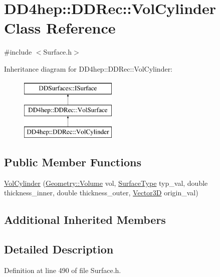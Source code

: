 \hypertarget{class_d_d4hep_1_1_d_d_rec_1_1_vol_cylinder}{}\section{D\+D4hep\+:\+:D\+D\+Rec\+:\+:Vol\+Cylinder Class Reference}
\label{class_d_d4hep_1_1_d_d_rec_1_1_vol_cylinder}


{\ttfamily \#include $<$Surface.\+h$>$}

Inheritance diagram for D\+D4hep\+:\+:D\+D\+Rec\+:\+:Vol\+Cylinder\+:\begin{figure}[H]
\begin{center}
\leavevmode
\includegraphics[height=3.000000cm]{class_d_d4hep_1_1_d_d_rec_1_1_vol_cylinder}
\end{center}
\end{figure}
\subsection*{Public Member Functions}
\begin{DoxyCompactItemize}
\item 
\hyperlink{class_d_d4hep_1_1_d_d_rec_1_1_vol_cylinder_ae559c0cb9b5a969ba0f14db3d419d376}{Vol\+Cylinder} (\hyperlink{class_d_d4hep_1_1_geometry_1_1_volume}{Geometry\+::\+Volume} vol, \hyperlink{class_d_d_surfaces_1_1_surface_type}{Surface\+Type} typ\+\_\+val, double thickness\+\_\+inner, double thickness\+\_\+outer, \hyperlink{class_d_d_surfaces_1_1_vector3_d}{Vector3D} origin\+\_\+val)
\end{DoxyCompactItemize}
\subsection*{Additional Inherited Members}


\subsection{Detailed Description}


Definition at line 490 of file Surface.\+h.



